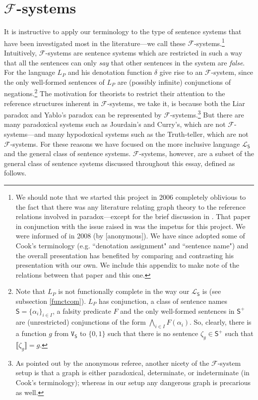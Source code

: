 \documentclass[12pt]{kluwer}
\theoremstyle{remark}
\newcommand{\fancy}[1]{\mathcal{#1}}
\def\S{\textsf{S}}
\def\V{\texttt{V}}
\def\L{\fancy{L}}
\def\F{\fancy{F}}
\def\F{\fancy{F}}
\begin{document}
\section{$\F$-systems}
\label{f-systems}

It is instructive to apply our terminology to the type of sentence systems that have been investigated most in the literature---we call these $\F$-systems.\footnote{We should note that we started this project in 2006 completely oblivious to the fact that there was any literature relating graph theory to the reference relations involved in paradox---except for the brief discussion in \cite{yablo06}. That paper in conjunction with the issue raised in \cite{yablo93} was the impetus for this project. We were informed of \cite{cook} in 2008 (by [anonymous]).
We have since adopted some of Cook's terminology (e.g. ``denotation assignment" and ``sentence name") and the overall presentation has benefited by comparing and contrasting his presentation with our own. We include this appendix to make note of the relations between that paper and this one.} Intuitively, $\F$-systems are sentence systems which are restricted in such a way that all the sentences can only \textit{say} that other sentences in the system are \textit{false}. For \cite{cook} the language $L_P$ and his denotation function $\delta$ give rise to an $\F$-system, since the only well-formed sentences of $L_P$ are (possibly infinite) conjunctions of negations.\footnote{Note that $L_P$ is not functionally complete in the way our $\L_\S$ is (see subsection \ref{functcom}). $L_P$ has conjunction, a class of sentence names $\S = \{\alpha_i\}_{i \in I}$, a falsity predicate $F$ and the only well-formed sentences in $\S^{+}$ are (unrestricted) conjunctions of the form $\bigwedge_{i \in I} F(\alpha_i)$. So, clearly, there is a function $g$ from $\V_\S$ to $\{0,1\}$ such that there is no sentence $\zeta_g \in \S^{+}$ such that $\llbracket \zeta_g\rrbracket = g$.}  The motivation for theorists to restrict their attention to the reference structures inherent in $\F$-systems, we take it, is because both the Liar paradox and Yablo's paradox can be represented by $\F$-systems.\footnote{As pointed out by the anonymous referee, another nicety of the $\F$-system setup is that a graph is either paradoxical, determinate,
or indeterminate (in Cook's terminology); whereas in our setup any dangerous graph is precarious as well.} But there are many paradoxical systems such as Jourdain's and Curry's, which are not $\F$-systems---and many hypodoxical systems such as the Truth-teller, which are not $\F$-systems. For these reasons we have focused on the more inclusive language $\L_\S$ and the general class of sentence systems. $\F$-systems, however, are a subset of the general class of sentence systems discussed throughout this essay, defined as follows.
\end{document}
